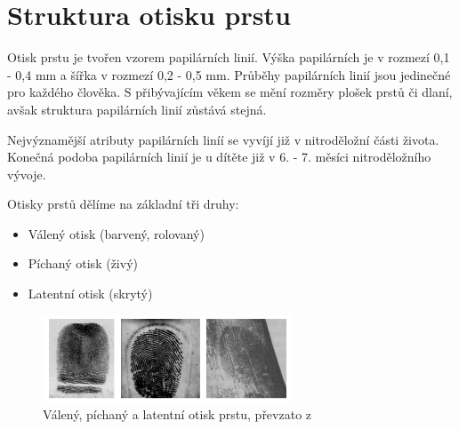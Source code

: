 \section{Struktura otisku prstu}
Otisk prstu je tvořen vzorem papilárních linií. Výška papilárních je v rozmezí 0,1 - 0,4 mm a šířka v rozmezí 0,2 - 0,5 mm. \cite{Drahansky} Průběhy papilárních linií jsou jedinečné pro každého člověka. S přibývajícím věkem se mění rozměry plošek prstů či dlaní, avšak struktura papilárních linií zůstává stejná.

Nejvýznamější atributy papilárních liníí se vyvíjí již v nitroděložní části života. Konečná podoba papilárních linií je u dítěte již v 6. - 7. měsíci nitroděložního vývoje. \cite{DrahanskyBrezinova}

Otisky prstů dělíme na základní tři druhy: \cite{Drahansky}
\begin{itemize}
\item Válený otisk (barvený, rolovaný)
\item Píchaný otisk (živý)
\item Latentní otisk (skrytý)
\end{itemize}

\begin{figure}[!htbp]
    \centering
    \includegraphics[width=280px]{obrazky-figures/druhyotisk.png}
    \caption{Válený, píchaný a latentní otisk prstu, převzato z \cite{Drahansky}}
\end{figure}

